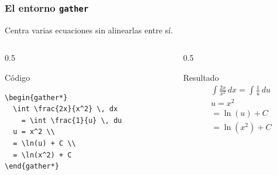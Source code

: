 \documentclass[12pt,aspectratio=169,ignorenonframetext]{ltxbeamer}
\begin{document}
\begin{frame}[fragile]
\frametitle{El entorno \texttt{gather}}
Centra varias ecuaciones sin alinearlas entre sí.

\begin{columns}
    \begin{column}{0.5\textwidth}
        \begin{block}{Código}
\begin{verbatim}
\begin{gather*}
  \int \frac{2x}{x^2} \, dx
    = \int \frac{1}{u} \, du
  u = x^2 \\
  = \ln(u) + C \\
  = \ln(x^2) + C
\end{gather*}
\end{verbatim}
        \end{block}
    \end{column}

    \begin{column}{0.5\textwidth}
        \begin{exampleblock}{Resultado}
            \begin{equation*}
                \begin{gathered}
                    \int \frac{2x}{x^2} \, dx
                      = \int \frac{1}{u} \, du \\
                    u = x^2 \\
                    = \ln(u) + C \\
                    = \ln(x^2) + C
                \end{gathered}
            \end{equation*}
        \end{exampleblock}
    \end{column}
\end{columns}
\end{frame}
\end{document}
